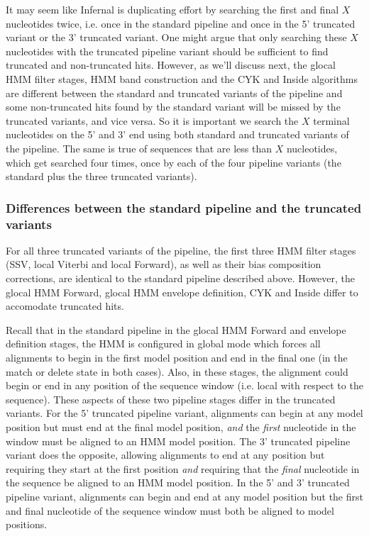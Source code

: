 It may seem like Infernal is duplicating effort by searching the first
and final $X$ nucleotides twice, i.e. once in the standard pipeline
and once in the 5' truncated variant or the 3' truncated variant. One
might argue that only searching these $X$ nucleotides with the
truncated pipeline variant should be sufficient to find truncated and
non-truncated hits. However, as we'll discuss next, the glocal HMM
filter stages, HMM band construction and the CYK and Inside algorithms
are different between the standard and truncated variants of the
pipeline and some non-truncated hits found by the standard variant
will be missed by the truncated variants, and vice versa. So it is
important we search the $X$ terminal nucleotides on the 5' and 3' end
using both standard and truncated variants of the pipeline. The same
is true of sequences that are less than $X$ nucleotides, which get
searched four times, once by each of the four pipeline variants (the
standard plus the three truncated variants).

\subsubsection{Differences between the standard pipeline and the
  truncated variants}

For all three truncated variants of the pipeline, the first three HMM
filter stages (SSV, local Viterbi and local Forward), as well as their
bias composition corrections, are identical to the standard pipeline
described above. However, the glocal HMM Forward, glocal HMM envelope
definition, CYK and Inside differ to accomodate truncated hits.

Recall that in the standard pipeline in the glocal HMM Forward and
envelope definition stages, the HMM is configured in global mode which
forces all alignments to begin in the first model position and end in
the final one (in the match or delete state in both cases). Also, in
these stages, the alignment could begin or end in any position of the
sequence window (i.e. local with respect to the sequence).  These
aspects of these two pipeline stages differ in the truncated variants.
For the 5' truncated pipeline variant, alignments can begin
at any model position but must end at the final model position,
\emph{and} the \emph{first} nucleotide in the window must be aligned to an HMM
model position. The 3' truncated pipeline variant does the opposite,
allowing alignments to end at any position but requiring they start at
the first position \emph{and} requiring that the \emph{final} nucleotide
in the sequence be aligned to an HMM model position. 
In the 5' and 3' truncated pipeline variant, alignments can begin and
end at any model position but the first and final nucleotide of the
sequence window must both be aligned to model positions. 

